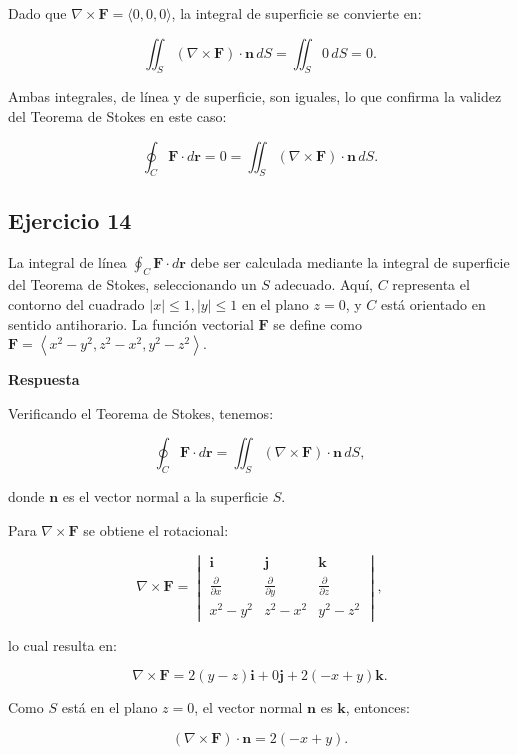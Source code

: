 \documentclass{report}
\begin{document}
Dado que \( \nabla \times \mathbf{F} = \langle 0, 0, 0 \rangle \), la integral de superficie se convierte en:

\[
\iint_S (\nabla \times \mathbf{F}) \cdot \mathbf{n} \, dS = \iint_S 0 \, dS = 0.
\]

Ambas integrales, de línea y de superficie, son iguales, lo que confirma la validez del Teorema de Stokes en este caso:

\[
\oint_C \mathbf{F} \cdot d\mathbf{r} = 0 = \iint_S (\nabla \times \mathbf{F}) \cdot \mathbf{n} \, dS.
\]

\subsection*{Ejercicio 14}
La integral de línea \( \oint_C \mathbf{F} \cdot d \mathbf{r} \) debe ser calculada mediante la integral de superficie del Teorema de Stokes, seleccionando un \( S \) adecuado. Aquí, \( C \) representa el contorno del cuadrado \( |x| \leq 1, |y| \leq 1 \) en el plano \( z=0 \), y \( C \) está orientado en sentido antihorario. La función vectorial \( \mathbf{F} \) se define como \( \mathbf{F}=\left\langle x^2-y^2, z^2-x^2, y^2-z^2 \right\rangle \).

\textbf{Respuesta}

Verificando el Teorema de Stokes, tenemos:

\[
\oint_C \mathbf{F} \cdot d\mathbf{r} = \iint_S (\nabla \times \mathbf{F}) \cdot \mathbf{n} \, dS,
\]

donde \( \mathbf{n} \) es el vector normal a la superficie \( S \).

Para \( \nabla \times \mathbf{F} \) se obtiene el rotacional:

\[
\nabla \times \mathbf{F} = \begin{vmatrix}
\mathbf{i} & \mathbf{j} & \mathbf{k} \\
\frac{\partial}{\partial x} & \frac{\partial}{\partial y} & \frac{\partial}{\partial z} \\
x^2 - y^2 & z^2 - x^2 & y^2 - z^2
\end{vmatrix},
\]

lo cual resulta en:

\[
\nabla \times \mathbf{F} = 2 \left( y - z \right) \mathbf{i} + 0 \mathbf{j} + 2 \left( -x + y \right) \mathbf{k}.
\]

Como \( S \) está en el plano \( z = 0 \), el vector normal \( \mathbf{n} \) es \( \mathbf{k} \), entonces:

\[
(\nabla \times \mathbf{F}) \cdot \mathbf{n} = 2 \left( -x + y \right).
\]
\end{document}
